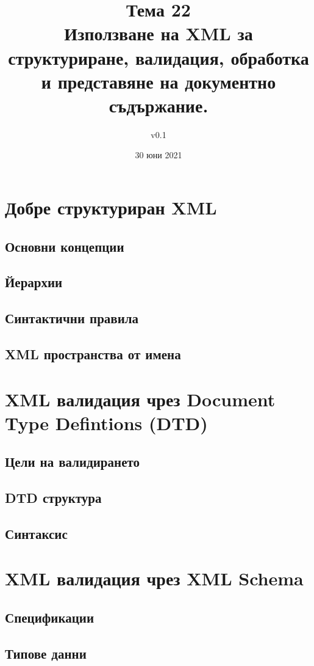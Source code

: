 \documentclass[fleqn,12pt]{article}
\title{Тема 22 \\Използване на XML за структуриране, валидация, обработка и представяне на документно съдържание.}
\author{v0.1}
\date{30 юни 2021}
\begin{document}
\maketitle
\tableofcontents
\pagebreak

\section{Добре структуриран XML}

\subsection{Основни концепции}
\subsection{Йерархии}
\subsection{Синтактични правила}
\subsection{XML пространства от имена}

\section{XML валидация чрез Document Type Defintions (DTD)}

\subsection{Цели на валидирането}
\subsection{DTD структура}
\subsection{Синтаксис}

\section{XML валидация чрез XML Schema}

\subsection{Спецификации}
\subsection{Типове данни}
\end{document}
